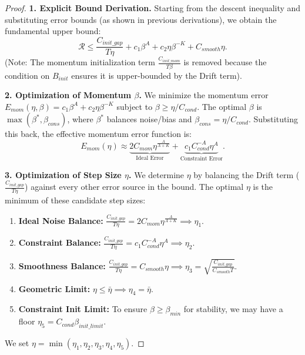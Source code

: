 \documentclass{article}
\theoremstyle{plain}
\theoremstyle{definition}
\theoremstyle{remark}
\begin{document}
\begin{proof}
\textbf{1. Explicit Bound Derivation.}
Starting from the descent inequality and substituting error bounds (as shown in previous derivations), we obtain the fundamental upper bound:
$$ \mathcal{R} \le \frac{C_{init\_gap}}{T \eta} + c_1 \beta^A + c_2 \eta \beta^{-K} + C_{smooth} \eta. $$
(Note: The momentum initialization term $\frac{C_{init\_mom}}{T \beta}$ is removed because the condition on $B_{init}$ ensures it is upper-bounded by the Drift term).

\textbf{2. Optimization of Momentum $\beta$.}
We minimize the momentum error $E_{mom}(\eta, \beta) = c_1 \beta^A + c_2 \eta \beta^{-K}$ subject to $\beta \ge \eta / C_{cond}$.
The optimal $\beta$ is $\max(\beta^*, \beta_{cons})$, where $\beta^*$ balances noise/bias and $\beta_{cons} = \eta/C_{cond}$.
Substituting this back, the effective momentum error function is:
$$ E_{mom}(\eta) \approx \underbrace{2 C_{mom} \eta^{\frac{A}{A+K}}}_{\text{Ideal Error}} + \underbrace{c_1 C_{cond}^{-A} \eta^A}_{\text{Constraint Error}}. $$

\textbf{3. Optimization of Step Size $\eta$.}
We determine $\eta$ by balancing the Drift term ($\frac{C_{init\_gap}}{T \eta}$) against every other error source in the bound. The optimal $\eta$ is the minimum of these candidate step sizes:
\begin{enumerate}
    \item \textbf{Ideal Noise Balance:} $\frac{C_{init\_gap}}{T \eta} = 2 C_{mom} \eta^{\frac{A}{A+K}} \implies \eta_1$.
    \item \textbf{Constraint Balance:} $\frac{C_{init\_gap}}{T \eta} = c_1 C_{cond}^{-A} \eta^A \implies \eta_2$.
    \item \textbf{Smoothness Balance:} $\frac{C_{init\_gap}}{T \eta} = C_{smooth} \eta \implies \eta_3 = \sqrt{\frac{C_{init\_gap}}{C_{smooth} T}}$.
    \item \textbf{Geometric Limit:} $\eta \le \bar{\eta} \implies \eta_4 = \bar{\eta}$.
    \item \textbf{Constraint Init Limit:} To ensure $\beta \ge \beta_{min}$ for stability, we may have a floor $\eta_5 = C_{cond} \beta_{init\_limit}$.
\end{enumerate}
We set $\eta = \min(\eta_1, \eta_2, \eta_3, \eta_4, \eta_5)$.


\end{proof}
\end{document}
